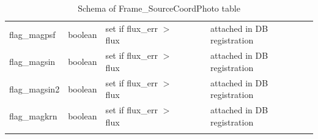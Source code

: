 \documentclass[12pt]{article}
\begin{document}
\begin{table}[thbp]
\begin{center}
{\begin{tabular}{llllll}
flag\_magpsf & boolean & set if flux\_err $>$ flux                              &                            &             & attached in DB registration  \\
flag\_magsin & boolean & set if flux\_err $>$ flux                              &                            &             & attached in DB registration  \\
flag\_magsin2 & boolean & set if flux\_err $>$ flux                              &                            &             & attached in DB registration  \\
flag\_magkrn & boolean & set if flux\_err $>$ flux                              &                            &             & attached in DB registration  \\
\hline\\
\end{tabular}
}
\caption{Schema of Frame\_SourceCoordPhoto table}
\end{center}
\end{table}
\end{document}
